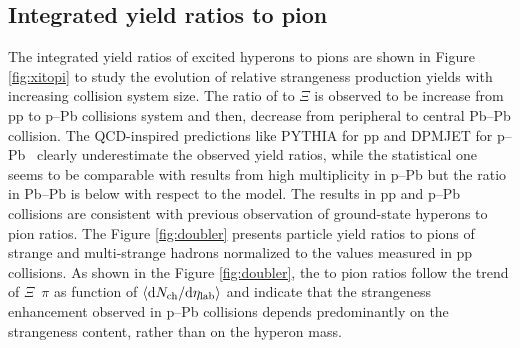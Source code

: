 \subsection{Integrated yield ratios to pion}
The integrated yield ratios of excited hyperons to pions are shown in Figure \ref{fig:xitopi} to study the evolution of relative strangeness production yields with increasing collision system size. The ratio of \xis to $\Xi$ is observed to be increase from pp to p--Pb collisions system and then, decrease from peripheral to central Pb--Pb collision. The QCD-inspired predictions like PYTHIA for pp \cite{cite:pythia8} and DPMJET for p--Pb~\cite{cite:DPMJET} clearly underestimate the observed yield ratios, while the statistical one seems to be comparable with results from high multiplicity in p--Pb but the ratio in Pb--Pb is below with respect to the model. 
The results in pp and p--Pb collisions are consistent with previous observation of ground-state hyperons to pion ratios. The Figure \ref{fig:doubler} presents particle yield ratios to pions of strange and multi-strange hadrons normalized to the values measured in pp collisions. As shown in the Figure \ref{fig:doubler}, the \xis to pion ratios follow the trend of $\Xi$\ $\pi$ as function  of $\meandNdeta$ and indicate that the strangeness enhancement observed in p--Pb collisions depends predominantly on the strangeness content, rather than on the hyperon mass. 



